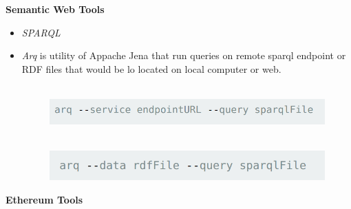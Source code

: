 \textbf{Semantic Web Tools}\\
\begin{itemize}

\item \textit{SPARQL}\\
\item \textit{Arq} is utility of Appache Jena that run queries on remote sparql endpoint or RDF files that would be lo located on local computer or web.
\begin{center}
	
	\begin{figure}[htb!]
	
		\begin{minipage}{0.75\linewidth}
			\hspace{3cm} \\
			\includegraphics[width=1\textwidth]{images/chap03_service.png}
			
			
			\hspace{3cm} \\
			\includegraphics[width=1\textwidth]{images/chap03_rdf.png}
		\end{minipage}
			
	\end{figure}
	
 \end{center}
 
\end{itemize}
\textbf{Ethereum Tools}
